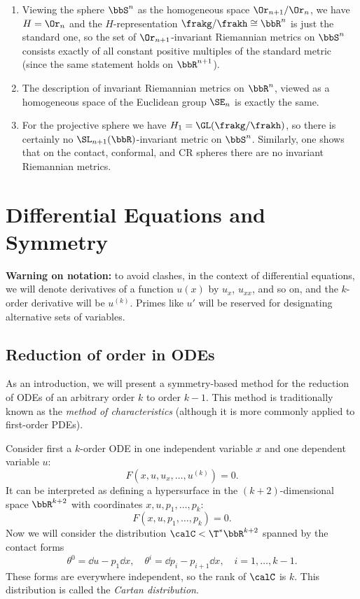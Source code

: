\begin{example}
    \begin{enumerate}
        \item Viewing the sphere $\bbS^n$ as the homogeneous space $\Or_{n+1}\slash \Or_n$, we have $H=\Or_n$ and the $H$-representation $\frakg\slash\frakh\cong\bbR^n$ is just the standard one, so the set of $\Or_{n+1}$-invariant Riemannian metrics on $\bbS^n$ consists exactly of all constant positive multiples of the standard metric (since the same statement holds on $\bbR^{n+1}$).
        \item The description of invariant Riemannian metrics on $\bbR^n$, viewed as a homogeneous space of the Euclidean group $\SE_n$ is exactly the same. 
        \item For the projective sphere we have $H_1=\GL(\frakg\slash\frakh)$, so there is certainly no $\SL_{n+1}(\bbR)$-invariant metric on $\bbS^n$. Similarly, one shows that on the contact, conformal, and CR spheres there are no invariant Riemannian metrics.
    \end{enumerate}
\end{example}









\chapter{Differential Equations and Symmetry \texorpdfstring{\ucmark}{}}


\textbf{Warning on notation:} to avoid clashes, in the context of differential equations, we will denote derivatives of a function $u(x)$ by $u_x$, $u_{xx}$, and so on, and the $k$-order derivative will be $u^{(k)}$. Primes like $u'$ will be reserved for designating alternative sets of variables.




\section{Reduction of order in ODEs}


As an introduction, we will present a symmetry-based method for the reduction of ODEs of an arbitrary order $k$ to order $k-1$. This method is traditionally known as the \emph{method of characteristics} (although it is more commonly applied to first-order PDEs).

Consider first a $k$-order ODE in one independent variable $x$ and one dependent variable $u$:
\[F\left(x,u,u_x,\ldots,u^{(k)}\right)=0.\]
It can be interpreted as defining a hypersurface in the $(k+2)$-dimensional space $\bbR^{k+2}$ with coordinates $x,u,p_1,\ldots,p_k$:
\[F(x,u,p_1,\ldots,p_k)=0.\]
Now we will consider the distribution $\calC<\T^\ast \bbR^{k+2}$ spanned by the contact forms 
\[\theta^0=\dd u-p_1\dd x,\quad \theta^i=\dd p_i-p_{i+1}\dd x,\quad i=1,\ldots,k-1.\]
These forms are everywhere independent, so the rank of $\calC$ is $k$. This distribution is called the \emph{Cartan distribution}.

